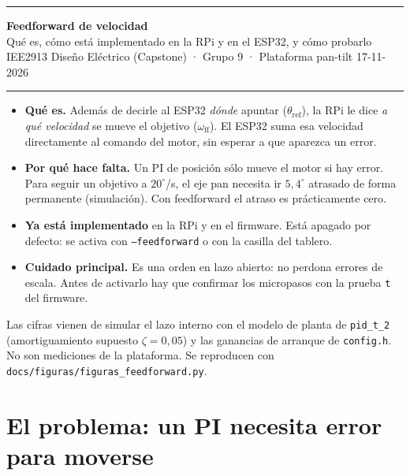\documentclass[11pt,a4paper]{article}
\newcommand{\cod}[1]{\texttt{#1}}
\newcommand{\gr}{^{\circ}}
\begin{document}
{\color{azulosc}\rule{\linewidth}{1.4pt}}

\vspace{0.5em}
{\LARGE\bfseries Feedforward de velocidad}\\[0.35em]
{\large Qué es, cómo está implementado en la RPi y en el ESP32, y cómo probarlo}\\[0.5em]
{\small\color{tintados}IEE2913 Diseño Eléctrico (Capstone) · Grupo 9 · Plataforma pan-tilt \hfill 17-11-2026}

\vspace{0.2em}
{\color{regla}\rule{\linewidth}{0.5pt}}

\begin{clave}[title={Lo esencial}]
\begin{itemize}[leftmargin=1.2em]
  \item \textbf{Qué es.} Además de decirle al ESP32 \emph{dónde} apuntar ($\theta_{\mathrm{ref}}$), la RPi le dice
        \emph{a qué velocidad} se mueve el objetivo ($\omega_{\mathrm{ff}}$). El ESP32 suma esa velocidad
        directamente al comando del motor, sin esperar a que aparezca un error.
  \item \textbf{Por qué hace falta.} Un PI de posición sólo mueve el motor si hay error. Para seguir un objetivo
        a $20\gr$/s, el eje pan necesita ir $5{,}4\gr$ atrasado de forma permanente (simulación). Con
        feedforward el atraso es prácticamente cero.
  \item \textbf{Ya está implementado} en la RPi y en el firmware. Está apagado por defecto: se activa con
        \cod{--feedforward} o con la casilla del tablero.
  \item \textbf{Cuidado principal.} Es una orden en lazo abierto: no perdona errores de escala. Antes de
        activarlo hay que confirmar los micropasos con la prueba \cod{t} del firmware.
\end{itemize}
\end{clave}

{\small\color{tintados}Las cifras vienen de simular el lazo interno con el modelo de planta de \cod{pid\_t\_2}
(amortiguamiento supuesto $\zeta = 0{,}05$) y las ganancias de arranque de \cod{config.h}. No son mediciones de la
plataforma. Se reproducen con \cod{docs/figuras/figuras\_feedforward.py}.}

\section{El problema: un PI necesita error para moverse}
\end{document}
